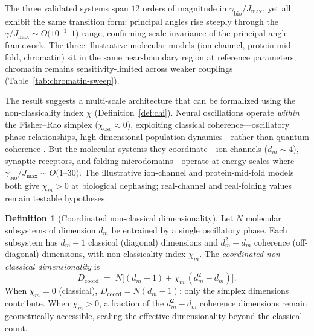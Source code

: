 \documentclass[12pt,a4paper]{article}
\theoremstyle{definition}
\newtheorem{definition}[theorem]{Definition}
\theoremstyle{remark}
\begin{document}
The three validated systems span $12$ orders of magnitude in $\gamma_{\mathrm{bio}}/J_{\max}$, yet all exhibit the same transition form: principal angles rise steeply through the $\gamma/J_{\max} \sim O(10^{-1}$--$1)$ range, confirming scale invariance of the principal angle framework. The three illustrative molecular models (ion channel, protein mid-fold, chromatin) sit in the same near-boundary region at reference parameters; chromatin remains sensitivity-limited across weaker couplings (Table~\ref{tab:chromatin-sweep}).

The result suggests a multi-scale architecture that can be formalized using the non-classicality index $\chi$ (Definition~\ref{def:chi}). Neural oscillations operate \emph{within} the Fisher--Rao simplex ($\chi_{\mathrm{osc}} \approx 0$), exploiting classical coherence---oscillatory phase relationships, high-dimensional population dynamics---rather than quantum coherence \cite{todd2026coherence,todd2026intelligence}. But the molecular systems they coordinate---ion channels ($d_m \sim 4$), synaptic receptors, and folding microdomains---operate at energy scales where $\gamma_{\mathrm{bio}}/J_{\max} \sim O(1$--$30)$. The illustrative ion-channel and protein-mid-fold models both give $\chi_m > 0$ at biological dephasing; real-channel and real-folding values remain testable hypotheses.

\begin{definition}[Coordinated non-classical dimensionality]
\label{def:dcoord}
Let $N$ molecular subsystems of dimension $d_m$ be entrained by a single oscillatory phase. Each subsystem has $d_m - 1$ classical (diagonal) dimensions and $d_m^2 - d_m$ coherence (off-diagonal) dimensions, with non-classicality index $\chi_m$. The \emph{coordinated non-classical dimensionality} is
\begin{equation}
\label{eq:dcoord}
D_{\mathrm{coord}} \;=\; N\bigl[(d_m - 1) + \chi_m\,(d_m^2 - d_m)\bigr].
\end{equation}
When $\chi_m = 0$ (classical), $D_{\mathrm{coord}} = N(d_m - 1)$: only the simplex dimensions contribute. When $\chi_m > 0$, a fraction of the $d_m^2 - d_m$ coherence dimensions remain geometrically accessible, scaling the effective dimensionality beyond the classical count.
\end{definition}
\end{document}
